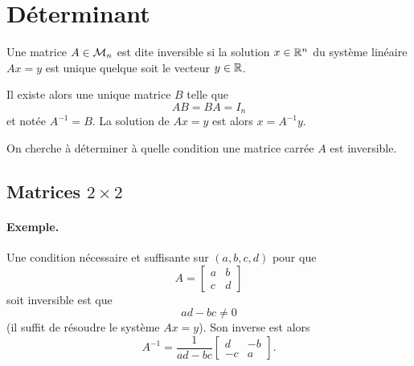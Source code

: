 \section{Déterminant} \label{sec:LinAlg-Det}

\begin{definition} \label{def:matriceInversible}
  Une matrice $A \in \mathcal{M}_n$ est dite inversible si la solution $x \in \mathbb{R}^n$ du système linéaire $A x = y$ est unique quelque soit le vecteur $y \in \mathbb{R}$.
\end{definition}

Il existe alors une unique matrice $B$ telle que 
$$
AB = BA = I_n
$$
et notée $A^{-1} = B$. La solution de $Ax = y$ est alors $x = A^{-1} y$.

\bigskip
On cherche à déterminer à quelle condition une matrice carrée $A$ est inversible.

\subsection{Matrices $2 \times 2$} 

\paragraph*{Exemple.}
Une condition nécessaire et suffisante sur $(a, b, c, d)$ pour que 
$$
A = \left[\begin{array}{cc} a & b \\ c & d \end{array} \right]
$$
soit inversible est que 
$$
ad - bc \neq 0
$$
(il suffit de résoudre le système $A x  = y$). Son inverse est alors
$$
A^{-1} = \frac1{ad - bc} \left[\begin{array}{rr} d & -b \\ -c & a \end{array}\right].
$$


